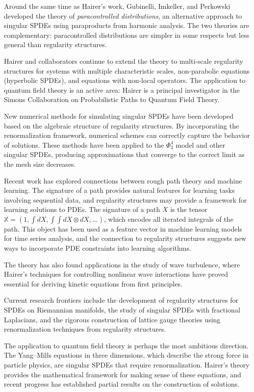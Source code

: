 Around the same time as Hairer's work, Gubinelli, Imkeller, and Perkowski developed the theory of \emph{paracontrolled distributions}, an alternative approach to singular SPDEs using paraproducts from harmonic analysis. The two theories are complementary: paracontrolled distributions are simpler in some respects but less general than regularity structures.

Hairer and collaborators continue to extend the theory to multi-scale regularity structures for systems with multiple characteristic scales, non-parabolic equations (hyperbolic SPDEs), and equations with non-local operators. The application to quantum field theory is an active area: Hairer is a principal investigator in the Simons Collaboration on Probabilistic Paths to Quantum Field Theory.

New numerical methods for simulating singular SPDEs have been developed based on the algebraic structure of regularity structures. By incorporating the renormalization framework, numerical schemes can correctly capture the behavior of solutions. These methods have been applied to the $\Phi^4_3$ model and other singular SPDEs, producing approximations that converge to the correct limit as the mesh size decreases.

Recent work has explored connections between rough path theory and machine learning. The signature of a path provides natural features for learning tasks involving sequential data, and regularity structures may provide a framework for learning solutions to PDEs. The signature of a path $X$ is the tensor $\mathbb{X} = (1, \int dX, \int\int dX\otimes dX, \ldots)$, which encodes all iterated integrals of the path. This object has been used as a feature vector in machine learning models for time series analysis, and the connection to regularity structures suggests new ways to incorporate PDE constraints into learning algorithms.

The theory has also found applications in the study of wave turbulence, where Hairer's techniques for controlling nonlinear wave interactions have proved essential for deriving kinetic equations from first principles.

Current research frontiers include the development of regularity structures for SPDEs on Riemannian manifolds, the study of singular SPDEs with fractional Laplacians, and the rigorous construction of lattice gauge theories using renormalization techniques from regularity structures.

The application to quantum field theory is perhaps the most ambitious direction. The Yang--Mills equations in three dimensions, which describe the strong force in particle physics, are singular SPDEs that require renormalization. Hairer's theory provides the mathematical framework for making sense of these equations, and recent progress has established partial results on the construction of solutions.

